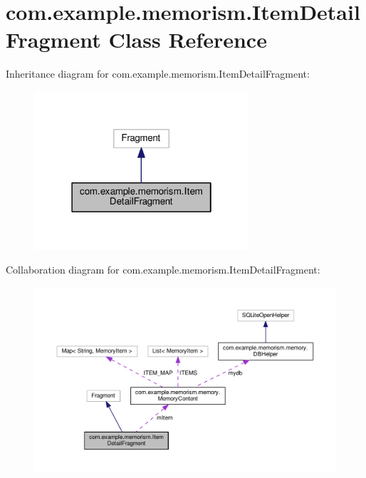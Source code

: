 \hypertarget{classcom_1_1example_1_1memorism_1_1_item_detail_fragment}{}\section{com.\+example.\+memorism.\+Item\+Detail\+Fragment Class Reference}
\label{classcom_1_1example_1_1memorism_1_1_item_detail_fragment}


Inheritance diagram for com.\+example.\+memorism.\+Item\+Detail\+Fragment\+:
\nopagebreak
\begin{figure}[H]
\begin{center}
\leavevmode
\includegraphics[width=226pt]{d1/db4/classcom_1_1example_1_1memorism_1_1_item_detail_fragment__inherit__graph}
\end{center}
\end{figure}


Collaboration diagram for com.\+example.\+memorism.\+Item\+Detail\+Fragment\+:
\nopagebreak
\begin{figure}[H]
\begin{center}
\leavevmode
\includegraphics[width=350pt]{de/d74/classcom_1_1example_1_1memorism_1_1_item_detail_fragment__coll__graph}
\end{center}
\end{figure}
